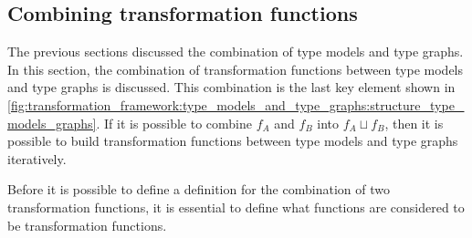 \subsection{Combining transformation functions}
\label{subsec:transformation_framework:type_models_and_type_graphs:combining_transformation_functions}

The previous sections discussed the combination of type models and type graphs. In this section, the combination of transformation functions between type models and type graphs is discussed. This combination is the last key element shown in \cref{fig:transformation_framework:type_models_and_type_graphs:structure_type_models_graphs}. If it is possible to combine $f_A$ and $f_B$ into $f_{A} \sqcup f_{B}$, then it is possible to build transformation functions between type models and type graphs iteratively.

Before it is possible to define a definition for the combination of two transformation functions, it is essential to define what functions are considered to be transformation functions.

